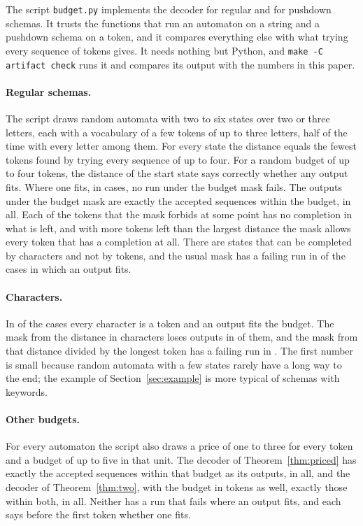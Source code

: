 \documentclass[acmsmall,nonacm,screen]{acmart}
\newcommand{\claim}[2]{#2}
\begin{document}
The script \texttt{budget.py} implements the decoder for regular and for pushdown schemas.
It trusts the functions that run an automaton on a string and a pushdown schema on a token,
and it compares everything else with what trying every sequence of tokens gives. It needs
nothing but Python, and \texttt{make -C artifact check} runs it and compares its output with
the numbers in this paper.

\paragraph{Regular schemas.} The script draws \exAutomata{} random automata with two to six
states over two or three letters, each with a vocabulary of a few tokens of up to three
letters, half of the time with every letter among them. \claim{regular}{For every state the
distance equals the fewest tokens found by trying every sequence of up to four. For a random
budget of up to four tokens, the distance of the start state says correctly whether any
output fits. Where one fits, in \exSafe{} cases, no run under the budget mask fails. The
outputs under the budget mask are exactly the accepted sequences within the budget,
\exOutputs{} in all. Each of the \exForbidden{} tokens that the mask forbids at some point
has no completion in what is left, and with more tokens left than the largest distance the
mask allows every token that has a completion at all. There are \exDead{} states that can be
completed by characters and not by tokens, and the usual mask has a failing run in
\exUsualFails{} of the cases in which an output fits.}

\paragraph{Characters.} \claim{characters}{In \exWithLetters{} of the cases every character
is a token and an output fits the budget. The mask from the distance in characters loses
outputs in \exUpperLoses{} of them, and the mask from that distance divided by the longest
token has a failing run in \exLowerFails{}.} The first number is small because random
automata with a few states rarely have a long way to the end; the example of
Section~\ref{sec:example} is more typical of schemas with keywords.

\paragraph{Other budgets.} For every automaton the script also draws a price of one to three
for every token and a budget of up to five in that unit. \claim{priced}{The decoder of
Theorem~\ref{thm:priced} has exactly the accepted sequences within that budget as its
outputs, \exPricedOne{} in all, and the decoder of Theorem~\ref{thm:two}, with the budget in
tokens as well, exactly those within both, \exPricedTwo{} in all. Neither has a run that
fails where an output fits, and each says before the first token whether one fits.}
\end{document}
